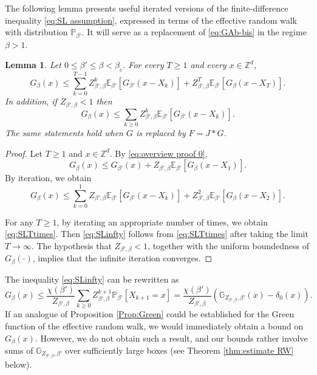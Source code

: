 \documentclass[11pt,a4paper]{article}
\numberwithin{equation}{section}
\theoremstyle{plain}
\newtheorem{Lem}[Thm]{Lemma}
\theoremstyle{definition}
\newcommand\1{\mathds{1}}
\begin{document}
The following lemma presents useful iterated versions of
the finite-difference inequality \eqref{eq:SL assumption},
expressed in terms of the effective random walk with distribution $\mathbb P_{\beta'}$. It
will serve as a replacement of \eqref{eq:GAb-bis} in the regime $\beta>1$.

\begin{Lem}
\label{lem: iterated SL}
Let $0\leq \beta'\leq \beta<\beta_c$. For every $T\geq 1$ and every $x\in \mathbb Z^d$,
\begin{equation}\label{eq:SLTtimes}
	G_{\beta}(x)\leq \sum_{k=0}^{T-1}Z_{\beta',\beta}^k \mathbb E_{\beta'}[G_{\beta'}(x-X_k)]+Z_{\beta',\beta}^T\mathbb E_{\beta'}[G_{\beta}(x-X_T)].
\end{equation}
In addition, if $Z_{\beta',\beta}< 1$ then
\begin{equation}
\label{eq:SLinfty}
	G_\beta(x)\leq \sum_{k\geq 0}Z_{\beta',\beta}^k \mathbb E_{\beta'}[G_{\beta'}(x-X_k)].
\end{equation}
The same statements hold when $G$ is replaced by $F=J*G$.
\end{Lem}

\begin{proof} Let $T\geq 1$ and $x\in \mathbb Z^d$. By \eqref{eq:overview proof 0},
\begin{equation}
	G_\beta(x)\leq G_{\beta'}(x)+Z_{\beta',\beta}\mathbb E_{\beta'}[G_\beta(x-X_1)].
\end{equation}
By iteration, we obtain
\begin{equation}
	G_\beta(x)\leq \sum_{k=0}^1 Z_{\beta',\beta} \mathbb E_{\beta'}[G_{\beta'}(x-X_k)]+Z_{\beta',\beta}^2\mathbb E_{\beta'}[G_{\beta}(x-X_2)].
\end{equation}


For any $T\ge 1$,
by iterating an appropriate number of times, we obtain \eqref{eq:SLTtimes}.
Then \eqref{eq:SLinfty} follows from \eqref{eq:SLTtimes} after taking the limit $T\rightarrow \infty$. The hypothesis that $Z_{\beta',\beta}< 1$, together with the uniform boundedness of $G_\beta(\cdot)$, implies that the infinite iteration
converges.
\end{proof}


The inequality \eqref{eq:SLinfty} can be rewritten as
    \begin{equation}\label{eq:easy bound G_beta GF}
        G_\beta(x)\leq \frac{\chi(\beta')}{Z_{\beta',\beta}}\sum_{k\geq 0}Z_{\beta',\beta}^{k+1} \mathbb P_{\beta'}[X_{k+1} = x]= \frac{\chi(\beta')}{Z_{\beta',\beta}}
        \left(\mathbb{G}_{Z_{\beta',\beta},\beta'}(x)-\delta_0(x)\right).
    \end{equation}
    If an analogue of Proposition \ref{Prop:Green} could be established for the Green function of the effective random walk, we would immediately obtain a bound on $G_\beta(x)$. However, we do not  
    obtain such a result, and our bounds rather involve sums of $\mathbb{G}_{Z_{\beta',\beta},\beta'}$ over sufficiently large boxes (see Theorem \ref{thm:estimate RW} below).
\end{document}
